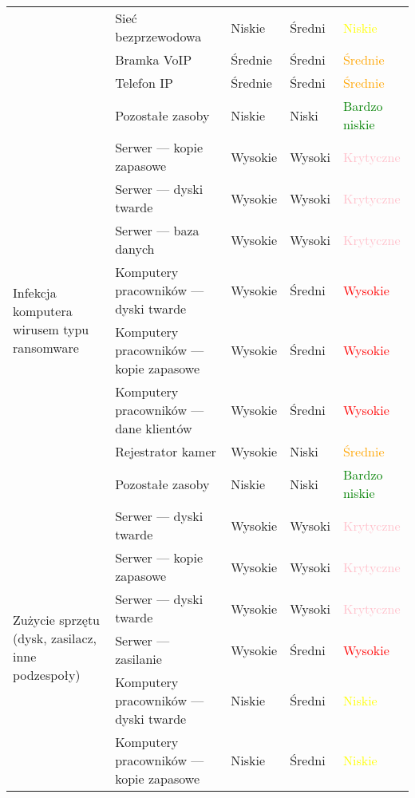 \begin{landscape}
\begin{longtable}[!ht]{|m{4cm}|m{6cm}|m{4.5cm}|m{3cm}|m{3cm}|}
		& Sieć bezprzewodowa & Niskie & Średni & \textcolor{yellow}{Niskie} \\ \cline{2-5}
		& Bramka VoIP & Średnie & Średni & \textcolor{orange}{Średnie} \\ \cline{2-5}
		& Telefon IP & Średnie & Średni & \textcolor{orange}{Średnie} \\ \cline{2-5}
		& Pozostałe zasoby & Niskie & Niski & \textcolor{green}{Bardzo niskie} \\ \cline{2-5}
	\hline
	\multirow{8}{4cm}{Infekcja komputera wirusem typu ransomware}
		& Serwer --- kopie zapasowe & Wysokie & Wysoki & \textcolor{pink}{Krytyczne} \\ \cline{2-5}
		& Serwer --- dyski twarde & Wysokie & Wysoki & \textcolor{pink}{Krytyczne} \\ \cline{2-5}
		& Serwer --- baza danych & Wysokie & Wysoki & \textcolor{pink}{Krytyczne} \\ \cline{2-5}
		& Komputery pracowników --- dyski twarde & Wysokie & Średni & \textcolor{red}{Wysokie} \\ \cline{2-5}
		& Komputery pracowników --- kopie zapasowe & Wysokie & Średni & \textcolor{red}{Wysokie} \\ \cline{2-5}
		& Komputery pracowników --- dane klientów & Wysokie & Średni & \textcolor{red}{Wysokie} \\ \cline{2-5}
		& Rejestrator kamer & Wysokie & Niski & \textcolor{orange}{Średnie} \\ \cline{2-5}
		& Pozostałe zasoby & Niskie & Niski & \textcolor{green}{Bardzo niskie} \\ \cline{2-5}
 	\hline 
 	\multirow{6}{4cm}{Zużycie sprzętu (dysk, zasilacz, inne podzespoły)}
 		& Serwer --- dyski twarde & Wysokie & Wysoki & \textcolor{pink}{Krytyczne} \\ \cline{2-5}
 		& Serwer --- kopie zapasowe & Wysokie & Wysoki & \textcolor{pink}{Krytyczne} \\ \cline{2-5}
 		& Serwer --- dyski twarde & Wysokie & Wysoki & \textcolor{pink}{Krytyczne} \\ \cline{2-5}
 		& Serwer --- zasilanie & Wysokie &Średni & \textcolor{red}{Wysokie} \\ \cline{2-5}
 		& Komputery pracowników --- dyski twarde & Niskie & Średni & \textcolor{yellow}{Niskie} \\ \cline{2-5}
 		& Komputery pracowników --- kopie zapasowe & Niskie & Średni & \textcolor{yellow}{Niskie} \\ \cline{2-5}
 	\hline
\end{longtable}
\end{landscape}

